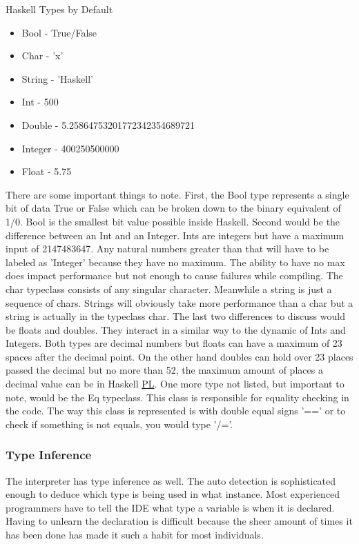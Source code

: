 \documentclass{article}
\begin{document}
    
    \caption{Haskell Types by Default}
    \begin{itemize}
              \item Bool - True/False
              \item Char - 'x'
              \item String - 'Haskell'
              \item Int - 500
              \item Double - 5.25864753201772342354689721
              \item Integer - 400250500000
              \item Float - 5.75
    \end{itemize}
    
    There are some important things to note. First, the Bool type represents a single bit of data True or False which can be broken down to the binary equivalent of 1/0. Bool is the smallest bit value possible inside Haskell. Second would be the difference between an Int and an Integer. Ints are integers but have a maximum input of 2147483647. Any natural numbers greater than that will have to be labeled as 'Integer' because they have no maximum. The ability to have no max does impact performance but not enough to cause failures while compiling. The char typeclass consists of any singular character. Meanwhile a string is just a sequence of chars. Strings will obviously take more performance than a char but a string is actually in the typeclass char. The last two differences to discuss would be floats and doubles. They interact in a similar way to the dynamic of Ints and Integers. Both types are decimal numbers but floats can have a maximum of 23 spaces after the decimal point. On the other hand doubles can hold over 23 places passed the decimal but no more than 52, the maximum amount of places a decimal value can be in Haskell \href{PL}{PL}. One more type not listed, but important to note, would be the Eq typeclass. This class is responsible for equality checking in the code. The way this class is represented is with double equal signs '==' or to check if something is not equals, you would type '/='.
            
    
    \subsubsection{Type Inference}
    The interpreter has type inference as well. The auto detection is sophisticated enough to deduce which type is being used in what instance. Most experienced programmers have to tell the IDE what type a variable is when it is declared. Having to unlearn the declaration is difficult because the sheer amount of times it has been done has made it such a habit for most individuals.
    
\end{document}

